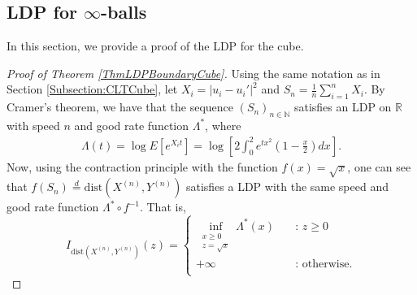 \documentclass[10pt]{amsart}
\newcounter{theor}
\def\R{\mathbb{R}}
\def\N{\mathbb{N}}
\numberwithin{equation}{section}
\begin{document}
\subsection{LDP for $\infty$-balls }

In this section, we provide a proof of the LDP for the cube.

\begin{proof}[Proof of Theorem \ref{ThmLDPBoundaryCube}]
Using the same notation as in Section \ref{Subsection:CLTCube}, let $X_i = |u_i-u_i'|^2$ and $S_n = \frac{1}{n} \sum_{i=1}^n X_i$. By Cramer's theorem, we have that the sequence $(S_n)_{n\in\N}$ satisfies an LDP on $\R$ with speed $n$ and good rate function $\Lambda^*$, where
\begin{align*}
\Lambda (t) = \log E \left[ e^{X_i t} \right] = \log \left[ 2 \int _{0} ^2 e^{t x^2 } \left( 1- \frac{x}{2} \right) dx \right].
\end{align*}
Now, using the contraction principle with the function $f(x) = \sqrt{x}$, one can see that $f(S_n) \overset{d}{=} \text{dist}(X^{(n)} , Y^{(n)}) $ satisfies a LDP with the same speed and good rate function $\Lambda^* \circ f^{-1}$. That is,
\[   
I_{\text{dist}(X^{(n)} , Y^{(n)})}(z)  = 
     \begin{cases}
       \displaystyle{\inf_{ \substack{x \geq 0 \\ z = \sqrt{x}}} \Lambda^* (x)}  &\quad\text{: }z \geq 0\\
       + \infty &\quad\text{: otherwise}. \\ 
     \end{cases}
\]
\end{proof}
\end{document}

